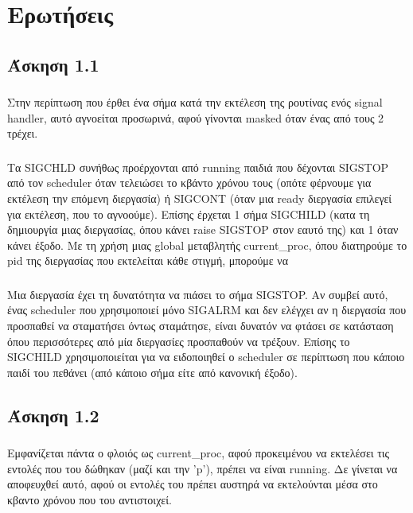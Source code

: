 \documentclass[a4paper,10pt]{article} \usepackage{anysize}
\begin{document}
\renewcommand{\theenumi}{\roman{enumi}}

\section*{Ερωτήσεις}
\setcounter{section}{3}
\subsection{Άσκηση 1.1}
\subsubsection{}
Στην περίπτωση που έρθει ένα σήμα κατά την εκτέλεση της ρουτίνας ενός signal
handler, αυτό αγνοείται προσωρινά, αφού γίνονται masked όταν ένας από τους 2
τρέχει.
\subsubsection{}
Τα SIGCHLD συνήθως προέρχονται από running παιδιά που δέχονται SIGSTOP από τον
scheduler όταν τελειώσει το κβάντο χρόνου τους (οπότε φέρνουμε για εκτέλεση
την επόμενη διεργασία) ή SIGCONT (όταν μια ready διεργασία επιλεγεί για
εκτέλεση, που το αγνοούμε). Επίσης έρχεται 1 σήμα SIGCHILD (κατα τη δημιουργία
μιας διεργασίας, όπου κάνει raise SIGSTOP στον εαυτό της) και 1 όταν κάνει
έξοδο. Με τη χρήση μιας global μεταβλητής current\_proc, όπου διατηρούμε το pid
της διεργασίας που εκτελείται κάθε στιγμή, μπορούμε να
\subsubsection{}
Μια διεργασία έχει τη δυνατότητα να πιάσει το σήμα SIGSTΟP. Αν συμβεί αυτό,
ένας scheduler που χρησιμοποιεί μόνο SIGALRM και δεν ελέγχει αν η διεργασία
που προσπαθεί να σταματήσει όντως σταμάτησε, είναι δυνατόν να φτάσει σε
κατάσταση όπου περισσότερες από μία διεργασίες προσπαθούν να τρέξουν. Επίσης
το SIGCHILD χρησιμοποιείται για να ειδοποιηθεί ο scheduler σε περίπτωση που
κάποιο παιδί του πεθάνει (από κάποιο σήμα είτε από κανονική έξοδο).

\subsection{Άσκηση 1.2}
\subsubsection{}
Εμφανίζεται πάντα ο φλοιός ως current\_proc, αφού προκειμένου να εκτελέσει τις
εντολές που του δώθηκαν (μαζί και την 'p'), πρέπει να είναι running. Δε
γίνεται να αποφευχθεί αυτό, αφού οι εντολές του πρέπει αυστηρά να εκτελούνται
μέσα στο κβαντο χρόνου που του αντιστοιχεί.
\end{document}

